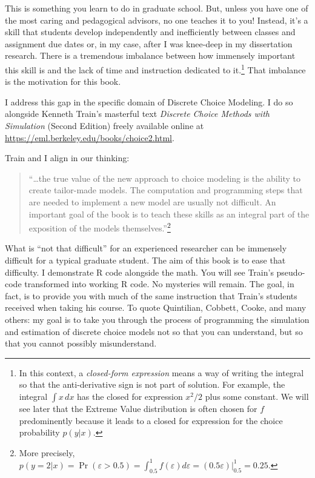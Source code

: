 \documentclass[
  letterpaper,
  DIV=11,
  numbers=noendperiod]{scrreprt}
\begin{document}
This is something you learn to do in graduate school. But, unless you
have one of the most caring and pedagogical advisors, no one teaches it
to you! Instead, it's a skill that students develop independently and
inefficiently between classes and assignment due dates or, in my case,
after I was knee-deep in my dissertation research. There is a tremendous
imbalance between how immensely important this skill is and the lack of
time and instruction dedicated to it.\footnote{In this context, a
  \emph{closed-form expression} means a way of writing the integral so
  that the anti-derivative sign is not part of solution. For example,
  the integral \(\int x \, dx\) has the closed for expression \(x^2/2\)
  plus some constant. We will see later that the Extreme Value
  distribution is often chosen for \(f\) predominently because it leads
  to a closed for expression for the choice probability \(p(y|x)\).}
That imbalance is the motivation for this book.

I address this gap in the specific domain of Discrete Choice Modeling. I
do so alongside Kenneth Train's masterful text \emph{Discrete Choice
Methods with Simulation} (Second Edition) freely available online at
\url{https://eml.berkeley.edu/books/choice2.html}.

Train and I align in our thinking:

\begin{quote}
``\ldots the true value of the new approach to choice modeling is the
ability to create tailor-made models. The computation and programming
steps that are needed to implement a new model are usually not
difficult. An important goal of the book is to teach these skills as an
integral part of the exposition of the models themselves.''\footnote{More
  precisely,
  \(p(y=2|x) = \Pr(\varepsilon > 0.5) = \int_{0.5}^1 f(\varepsilon) d\varepsilon = (0.5\varepsilon)\vert_{0.5}^1 = 0.25\).}
\end{quote}

What is ``not that difficult'' for an experienced researcher can be
immensely difficult for a typical graduate student. The aim of this book
is to ease that difficulty. I demonstrate R code alongside the math. You
will see Train's pseudo-code transformed into working R code. No
mysteries will remain. The goal, in fact, is to provide you with much of
the same instruction that Train's students received when taking his
course. To quote Quintilian, Cobbett, Cooke, and many others: my goal is
to take you through the process of programming the simulation and
estimation of discrete choice models not so that you can understand, but
so that you cannot possibly misunderstand.
\end{document}
